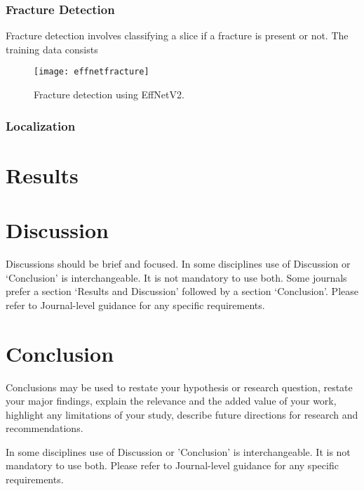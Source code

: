 \documentclass[pdflatex,sn-mathphys]{sn-jnl}%
\theoremstyle{thmstyleone}%
\theoremstyle{thmstyletwo}%
\theoremstyle{thmstylethree}%
\begin{document}
\subsubsection{Fracture Detection}\label{subsubsec2}

Fracture detection involves classifying a slice if a fracture is present or not. The training data consists 

\begin{figure}[H]
 \begin{minipage}[c]{1\textwidth}
 \centering
    \texttt{[image: effnetfracture]}
    \caption{\centering\footnotesize{ Fracture detection using EffNetV2. }}
    \label{fig:mesh6}
\end{minipage}
\end{figure}

\subsubsection{Localization}\label{subsubsec3}

\section{Results}\label{sec3}

\section{Discussion}\label{sec12}

Discussions should be brief and focused. In some disciplines use of Discussion or `Conclusion' is interchangeable. It is not mandatory to use both. Some journals prefer a section `Results and Discussion' followed by a section `Conclusion'. Please refer to Journal-level guidance for any specific requirements. 

\section{Conclusion}\label{sec13}

Conclusions may be used to restate your hypothesis or research question, restate your major findings, explain the relevance and the added value of your work, highlight any limitations of your study, describe future directions for research and recommendations. 

In some disciplines use of Discussion or 'Conclusion' is interchangeable. It is not mandatory to use both. Please refer to Journal-level guidance for any specific requirements. 
\end{document}
